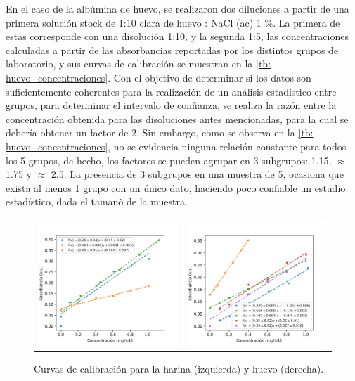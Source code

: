 \documentclass[fleqn,10pt]{SelfArx}
\begin{document}
	En el caso de la alb\'umina de huevo, se realizaron dos diluciones a partir de una primera soluci\'on stock de 1:10 clara de huevo : NaCl (ac) 1 \%. La primera de estas corresponde con una disoluci\'on 1:10, y la segunda 1:5, las concentraciones calculadas a partir de las absorbancias reportadas por los distintos grupos de laboratorio, y sus curvas de calibraci\'on se muestran en la \autoref{tb: huevo_concentraciones}. Con el objetivo de determinar si los datos son suficientemente coherentes para la realizaci\'on de un an\'alisis estad\'istico entre grupos, para determinar el intervalo de confianza, se realiza la raz\'on entre la concentraci\'on obtenida para las disoluciones antes mencionadas, para la cual se deber\'ia obtener un factor de 2. Sin embargo, como se observa en la \autoref{tb: huevo_concentraciones}, no se evidencia ninguna relaci\'on constante para todos los 5 grupos, de hecho, los factores se pueden agrupar en 3 subgrupos: 1.15, $\approx$ 1.75 y $\approx$ 2.5. La presencia de 3 subgrupos en una muestra de 5, ocasiona que exista al menos 1 grupo con un \'unico dato, haciendo poco confiable un estudio estad\'istico, dada el taman\~o de la muestra.
	\begin{figure}[h]
		\centering
		\begin{tabular}{cc}
			\includegraphics[width = 0.45\linewidth]{harinas_reg} & 
			\includegraphics[width = 0.45\linewidth]{huevos_reg}
		\end{tabular}
		\caption{Curvas de calibraci\'on para la harina (izquierda) y huevo (derecha).}
		\label{fig: pendientes}
	\end{figure}
\end{document}
